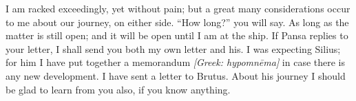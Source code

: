 

 I am racked exceedingly, yet without pain; but a great many considerations occur to me about our journey, on either side. ``How long?'' you will say. As long as the matter is still open; and it will be open until I am at the ship. If Pansa replies to your letter, I shall send you both my own letter and his. I was expecting Silius; for him I have put together a memorandum \textit{[Greek: hypomn\=ema]} in case there is any new development. I have sent a letter to Brutus. About his journey I should be glad to learn from you also, if you know anything.

